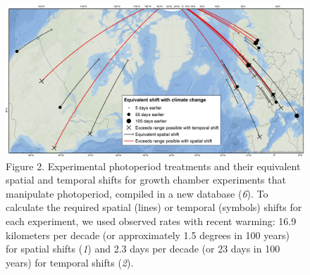 \documentclass[10.7pt,a4paper]{letter}
\begin{document}
\begin{letter}{}
\begin{footnotesize}
 \begin{figure}
\centering
\includegraphics[width=130mm,scale=0.5]{..//..//analyses/photoperiod/figures/ospree_photopmap_fromblake.jpg} 

\caption{Figure 2. Experimental photoperiod treatments and their equivalent spatial and temporal shifts for growth chamber experiments that manipulate photoperiod, compiled in a new database (\emph{6}). To calculate the required spatial (lines) or temporal (symbols) shifts for each experiment, we used observed rates with recent warming: 16.9 kilometers per decade (or approximately 1.5 degrees in 100 years) for spatial shifts (\emph{1}) and 2.3 days per decade (or 23 days in 100 years) for temporal shifts (\emph{2}).}
 \label{fig:photomap}
 \end{figure}


\end{footnotesize}
\end{letter}
\end{document}
